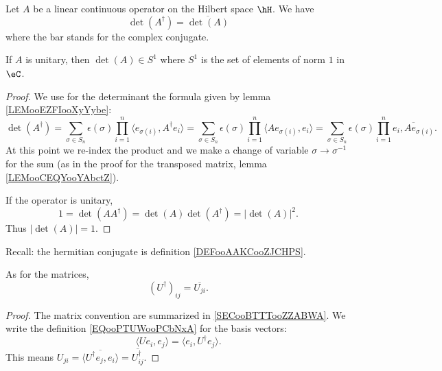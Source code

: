 \begin{lemma}       \label{LEMooKEUZooUjQVmp}
	Let \( A\) be a linear continuous operator on the Hilbert space \( \hH\). We have
	\begin{equation}
		\det(A^{\dag})=\overline{ \det(A) }
	\end{equation}
	where the bar stands for the complex conjugate.

	If \( A\) is unitary, then \( \det(A)\in S^1\) where \( S^1\) is the set of elements of norm \( 1\) in \( \eC\).
\end{lemma}

\begin{proof}
	We use for the determinant the formula given by lemma \ref{LEMooEZFIooXyYybe}:
	\begin{equation}
		\det(A^{\dag})=\sum_{\sigma\in S_n}\epsilon(\sigma)\prod_{i=1}^n\langle e_{\sigma(i)}, A^{\dag}e_i\rangle =  \sum_{\sigma\in S_n}\epsilon(\sigma)\prod_{i=1}^n \langle Ae_{\sigma(i)}, e_i\rangle = \sum_{\sigma\in S_n}\epsilon(\sigma)\prod_{i=1}^n\overline{ e_i,Ae_{\sigma(i)} }.
	\end{equation}
	At this point we re-index the product and we make a change of variable $\sigma\to \sigma^{-1}$ for the sum (as in the proof for the transposed matrix, lemma \ref{LEMooCEQYooYAbctZ}).

	If the operator is unitary,
	\begin{equation}
		1=\det(AA^{\dag})=\det(A)\det(A^{\dag})=| \det(A) |^2.
	\end{equation}
	Thus \( | \det(A) |=1\).
\end{proof}

Recall: the hermitian conjugate is definition \ref{DEFooAAKCooZJCHPS}.
\begin{lemma}
	As for the matrices,
	\begin{equation}
		(U^{\dag})_{ij}=\overline{ U_{ji} }.
	\end{equation}
\end{lemma}

\begin{proof}
	The matrix convention are summarized in \ref{SECooBTTTooZZABWA}. We write the definition \eqref{EQooPTUWooPCbNxA} for the basis vectors:
	\begin{equation}
		\langle Ue_i, e_j\rangle =\langle e_i, U^{\dag}e_j\rangle .
	\end{equation}
	This means \( U_{ji}=\overline{ \langle U^{\dag}e_j, e_i\rangle  }=\overline{ U^{\dag}_{ij} }\).
\end{proof}

